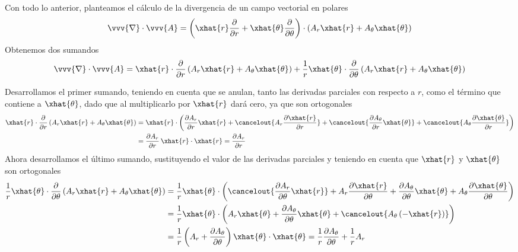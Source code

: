 \begin{enumerate}
  Con todo lo anterior, planteamos el cálculo de la divergencia de un campo vectorial en
  polares
  \[
    \vvv{\nabla}\cdot\vvv{A}
    =
    \left(%
      \xhat{r}\dfrac{\partial}{\partial r}
      + \xhat{\theta}\dfrac{\partial}{\partial\theta}
    \right)
    \cdot
    (A_r\xhat{r}+A_\theta\xhat{\theta})
  \]
  Obtenemos dos sumandos
  \begin{equation}\label{eq:R2-divergencia-sumandos}
    \vvv{\nabla}\cdot\vvv{A}
    = \xhat{r}\cdot
    \dfrac{\partial}{\partial r}\left(A_r\xhat{r}+A_\theta\xhat{\theta}\right)
    + \dfrac{1}{r}\xhat{\theta}\cdot\dfrac{\partial}{\partial\theta}
    \left(A_r\xhat{r}+A_\theta\xhat{\theta}\right)
  \end{equation}
  
  Desarrollamos el primer sumando, teniendo en cuenta que se anulan, tanto las derivadas
  parciales con respecto a $r$, como el término que contiene a $\xhat{\theta}$, dado que
  al multiplicarlo por $\xhat{r}$ dará cero, ya que son ortogonales
  \begin{align*}
    \xhat{r}\cdot
    \dfrac{\partial}{\partial r}\left(A_r\xhat{r}+A_\theta\xhat{\theta}\right)
    &=
      \xhat{r}\cdot
      \left(%
      \dfrac{\partial A_r}{\partial r}\xhat{r}
      + \cancelout{A_r\dfrac{\partial\xhat{r}}{\partial r}}
      + \cancelout{\dfrac{\partial A_\theta}{\partial r}\xhat{\theta}}
      + \cancelout{A_\theta\dfrac{\partial\xhat{\theta}}{\partial r}}
      \right)\\
    &=
      \dfrac{\partial A_r}{\partial r}\,\xhat{r}\cdot\xhat{r}
      = \dfrac{\partial A_r}{\partial r}
  \end{align*}
  Ahora desarrollamos el último sumando, sustituyendo el valor de las derivadas parciales
  y teniendo en cuenta que $\xhat{r}$ y $\xhat{\theta}$ son ortogonales
  \begin{align*}
    \dfrac{1}{r}\xhat{\theta}\cdot\dfrac{\partial}{\partial\theta}
    \left(A_r\xhat{r}+A_\theta\xhat{\theta}\right)
    &=
      \dfrac{1}{r}\xhat{\theta}\cdot
      \left(%
      \cancelout{\dfrac{\partial A_r}{\partial\theta}\xhat{r}}
      + A_r\dfrac{\partial\xhat{r}}{\partial\theta}
      + \dfrac{\partial A_\theta}{\partial\theta}\xhat{\theta}
      + A_\theta\dfrac{\partial\xhat{\theta}}{\partial\theta}
      \right)\\
    &= 
      \dfrac{1}{r}\xhat{\theta}\cdot
      \left(%
      A_r\xhat{\theta}
      + \dfrac{\partial A_\theta}{\partial\theta}\xhat{\theta}
      + \cancelout{A_\theta\,(-\xhat{r})}
      \right)\\
    &=
      \dfrac{1}{r}
      \left(%
      A_r + \dfrac{\partial A_\theta}{\partial\theta}
      \right)
      \xhat{\theta}\cdot\xhat{\theta}
      = \dfrac{1}{r}\dfrac{\partial A_\theta}{\partial\theta}
      + \dfrac{1}{r}A_r
  \end{align*}
  

\end{enumerate}
